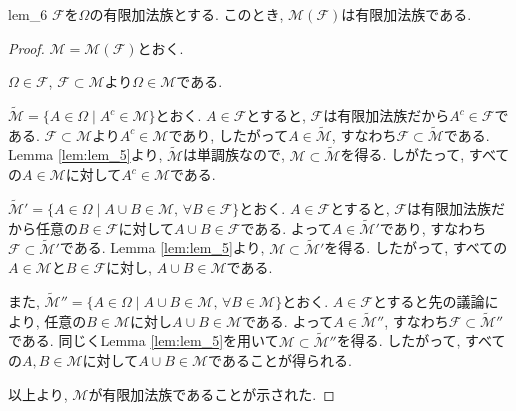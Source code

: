 \begin{lemma}{}{lem_6}
    $\mathcal{F}$を$\Omega$の有限加法族とする.
    このとき, $\mathcal{M}(\mathcal{F})$は有限加法族である.
\end{lemma}
\begin{proof}
    $\mathcal{M}=\mathcal{M}(\mathcal{F})$とおく.

    $\Omega\in\mathcal{F}$, $\mathcal{F}\subset\mathcal{M}$より$\Omega\in\mathcal{M}$である.

    $\tilde{\mathcal{M}}=\{A\in\Omega\mid A^c\in\mathcal{M}\}$とおく.
    $A\in\mathcal{F}$とすると, $\mathcal{F}$は有限加法族だから$A^c\in\mathcal{F}$である.
    $\mathcal{F}\subset\mathcal{M}$より$A^c\in\mathcal{M}$であり, したがって$A\in\tilde{\mathcal{M}}$, すなわち$\mathcal{F}\subset\tilde{\mathcal{M}}$である.
    Lemma \ref{lem:lem_5}より, $\tilde{\mathcal{M}}$は単調族なので, $\mathcal{M}\subset\tilde{\mathcal{M}}$を得る.
    しがたって, すべての$A\in\mathcal{M}$に対して$A^c\in\mathcal{M}$である.

    $\tilde{\mathcal{M}}'=\{A\in\Omega\mid A\cup B\in\mathcal{M},\,\forall B\in\mathcal{F}\}$とおく.
    $A\in\mathcal{F}$とすると, $\mathcal{F}$は有限加法族だから任意の$B\in\mathcal{F}$に対して$A\cup B\in\mathcal{F}$である.
    よって$A\in\tilde{\mathcal{M}}'$であり, すなわち$\mathcal{F}\subset\tilde{\mathcal{M}}'$である.
    Lemma \ref{lem:lem_5}より, $\mathcal{M}\subset\tilde{\mathcal{M}}'$を得る.
    したがって, すべての$A\in\mathcal{M}$と$B\in\mathcal{F}$に対し, $A\cup B\in\mathcal{M}$である.

    また, $\tilde{\mathcal{M}}''=\{A\in\Omega\mid A\cup B\in\mathcal{M},\,\forall B\in\mathcal{M}\}$とおく.
    $A\in\mathcal{F}$とすると先の議論により, 任意の$B\in\mathcal{M}$に対し$A\cup B\in\mathcal{M}$である.
    よって$A\in\tilde{\mathcal{M}}''$, すなわち$\mathcal{F}\subset\tilde{\mathcal{M}}''$である.
    同じくLemma \ref{lem:lem_5}を用いて$\mathcal{M}\subset\tilde{\mathcal{M}}''$を得る.
    したがって, すべての$A,B\in\mathcal{M}$に対して$A\cup B\in\mathcal{M}$であることが得られる.

    以上より, $\mathcal{M}$が有限加法族であることが示された.
\end{proof}

